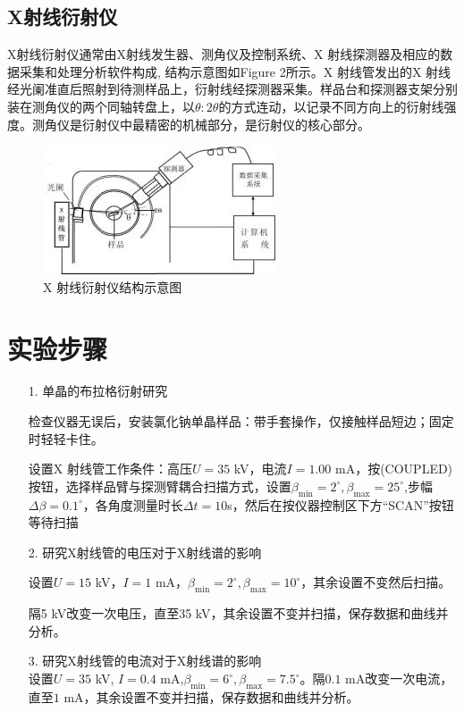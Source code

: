 \documentclass{whureport}
\begin{document}
\begin{multicols}{2}
	\subsection{X射线衍射仪}
	X射线衍射仪通常由X射线发生器、测角仪及控制系统、X 射线探测器及相应的数据采集和处理分析软件构成, 结构示意图如Figure 2所示。X 射线管发出的X 射线经光阑准直后照射到待测样品上，衍射线经探测器采集。样品台和探测器支架分别装在测角仪的两个同轴转盘上，以$\theta:2\theta$的方式连动，以记录不同方向上的衍射线强度。测角仪是衍射仪中最精密的机械部分，是衍射仪的核心部分。
	\begin{figure}[H]
		\centering
		\includegraphics[scale=0.7]{2.jpg}
		\captionsetup{font=footnotesize}
		\caption{X 射线衍射仪结构示意图}
	\end{figure}
	\section{实验步骤}
	\begin{itemize}
		\item [1.] 单晶的布拉格衍射研究\par 
		检查仪器无误后，安装氯化钠单晶样品：带手套操作，仅接触样品短边；固定时轻轻卡住。
		
		设置X 射线管工作条件：高压$U=35$ kV，电流$I=1.00$ mA，按(COUPLED)按钮，选择样品臂与探测臂耦合扫描方式，设置$\beta_{\min}=2^\circ,\beta_{\max}=25^\circ$,步幅$\Delta\beta=0.1^\circ$，各角度测量时长$\Delta t=10 $s，然后在按仪器控制区下方“SCAN”按钮等待扫描
		\item [2.] 研究X射线管的电压对于X射线谱的影响\par 
		设置$U=15$ kV，$I=1$ mA，$\beta_{\min}=2^\circ,\beta_{\max}=10^\circ$，其余设置不变然后扫描。
		
		隔5 kV改变一次电压，直至35 kV，其余设置不变并扫描，保存数据和曲线并分析。
		
		\item [3.]研究X射线管的电流对于X射线谱的影响\\
		设置$U=35$ kV, $I=0.4$ mA,$\beta_{\min}=6^\circ,\beta_{\max}=7.5^\circ$。隔$0.1$ mA改变一次电流，直至$1$ mA，其余设置不变并扫描，保存数据和曲线并分析。
	\end{itemize}

\end{multicols}
\end{document}
